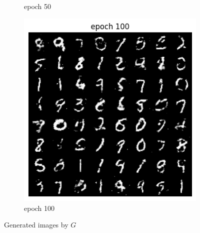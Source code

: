 \documentclass[a4paper]{article}
\theoremstyle{definition}
\newenvironment{soln}{
	\leavevmode\color{blue}\ignorespaces
}{}
\begin{document}
\begin{enumerate} [label=(\alph*)]
\begin{soln}
\begin{figure}[H]
\begin{subfigure}[b]{0.3\textwidth}
				\caption{epoch 50}
			\end{subfigure}
			\hfill
			\begin{subfigure}[b]{0.3\textwidth}
				\centering
				\includegraphics[width=\textwidth]{epoch_100_q3.png}
				\caption{epoch 100}
			\end{subfigure}
			\caption{Generated images by $G$}
			\label{fig:6}
		\end{figure}
        \end{soln}
		
	\end{enumerate}

\pagebreak
\end{document}
